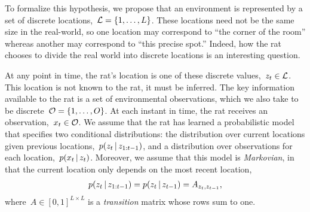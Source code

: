 To formalize this hypothesis, we propose that an environment is represented 
by a set of discrete locations,~${\mathcal{L} = \{1, \ldots, L\}}$. These locations 
need not be the same size in the real-world, so one location may correspond to
``the corner of the room'' whereas another may correspond to ``this precise 
spot.'' Indeed, how the rat chooses to divide the real world into discrete 
locations is an interesting question.

At any point in time, 
the rat's location is one of these discrete values,~${z_t \in \mathcal{L}}$. 
This location is not known to the rat, it must be inferred. 
The key information available to the rat is a set of environmental observations,
which we also take to be discrete~${\mathcal{O} = \{1, \ldots, O\}}$. At 
each instant in time, the rat receives an observation,~${x_t \in \mathcal{O}}$. 
We assume that the rat has learned a probabilistic model that specifies 
two conditional distributions: the distribution over current locations given 
previous locations,~${p(z_{t} \,|\, z_{1:t-1})}$, and a distribution over observations 
for each location,~${p(x_t \,|\, z_{t})}$. Moreover, we assume that this 
model is \emph{Markovian}, in that the current location only depends 
on the most recent location,
\begin{align}
p(z_t \,|\, z_{1:t-1}) = p(z_t \,|\, z_{t-1}) = A_{z_t, z_{t-1}},
\end{align}
where~$A \in [0,1]^{L \times L}$ is a \emph{transition} matrix whose rows sum to one.



